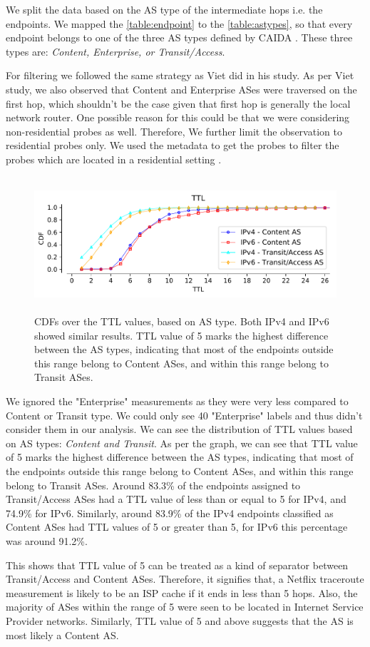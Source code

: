 We split the data based on the AS type of the intermediate hops i.e. the endpoints. We mapped the \cref{table:endpoint} to the \cref{table:astypes}, 
so that every endpoint belongs to one of the three AS types defined by CAIDA \cite{caida}. These three types are: \textit{Content, Enterprise, or Transit/Access}.

For filtering we followed the same strategy as Viet \cite{viet} did in his study. As per Viet study, we also observed that Content and Enterprise ASes 
were traversed on the first hop, which shouldn't be the case given that first hop is generally the local network router. One possible reason for this could be 
that we were considering non-residential probes as well. Therefore, We further limit the observation to residential probes only. We used the metadata to get the 
probes to filter the probes which are located in a residential setting \cite{metadata}.

\begin{figure}[!ht]
	\centering
	\includegraphics[keepaspectratio, height=5cm, width=15cm]{figures/traceroute/netflix-ttl-by-as-types-cdf.pdf}
	\caption[TTL by AS Types]{CDFs over the TTL values, based on AS type. Both IPv4 and IPv6 showed similar results. TTL value of 5 marks the highest difference between the AS types, indicating that most of the endpoints outside this range belong to Content ASes, and within this range belong to Transit ASes.}
	\label{fig:TTL by AS Types}
\end{figure}

We ignored the "Enterprise" measurements as they were very less compared to Content or Transit type. We could only see 40 "Enterprise" 
labels and thus didn't consider them in our analysis. We can see the distribution of TTL values based on AS types: \textit{Content and Transit}. 
As per the graph, we can see that TTL value of 5 marks the highest difference between the AS types, indicating that most of the endpoints outside this 
range belong to Content ASes, and within this range belong to Transit ASes. Around 83.3\% of the endpoints assigned to Transit/Access ASes had a TTL value of 
less than or equal to 5 for IPv4, and 74.9\% for IPv6. Similarly, around 83.9\% of the IPv4 endpoints classified as Content ASes had TTL values of 5 or greater than 5, 
for IPv6 this percentage was around 91.2\%. 

This shows that TTL value of 5 can be treated as a kind of separator between Transit/Access and Content ASes. Therefore, it signifies that, a Netflix traceroute 
measurement is likely to be an ISP cache if it ends in less than 5 hops. Also, the majority of ASes within the range of 5 were seen to be located in Internet Service 
Provider networks. Similarly, TTL value of 5 and above suggests that the AS is most likely a Content AS.
